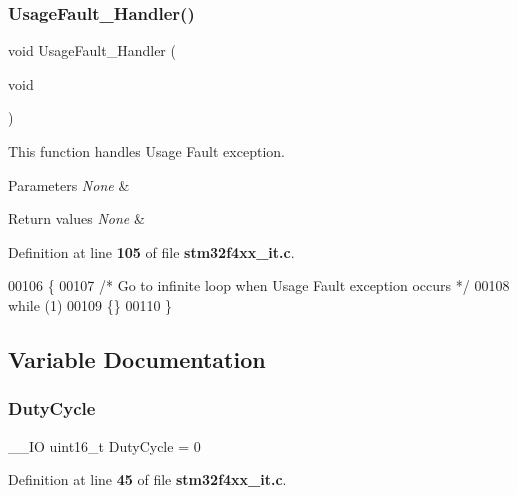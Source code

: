 \subsubsection{Usage\+Fault\+\_\+\+Handler()}
{\footnotesize\ttfamily void Usage\+Fault\+\_\+\+Handler (\begin{DoxyParamCaption}\item[{void}]{ }\end{DoxyParamCaption})}



This function handles Usage Fault exception. 


\begin{DoxyParams}{Parameters}
{\em None} & \\
\hline
\end{DoxyParams}

\begin{DoxyRetVals}{Return values}
{\em None} & \\
\hline
\end{DoxyRetVals}


Definition at line \textbf{ 105} of file \textbf{ stm32f4xx\+\_\+it.\+c}.


\begin{DoxyCode}
00106 \{
00107   \textcolor{comment}{/* Go to infinite loop when Usage Fault exception occurs */}
00108   \textcolor{keywordflow}{while} (1)
00109   \{\}
00110 \}
\end{DoxyCode}


\subsection{Variable Documentation}
\mbox{\label{group__TIM__PWM__Input_gab9dc41d132c0c4158a03bf7c66051f46}} 
\subsubsection{Duty\+Cycle}
{\footnotesize\ttfamily \+\_\+\+\_\+\+IO uint16\+\_\+t Duty\+Cycle = 0}



Definition at line \textbf{ 45} of file \textbf{ stm32f4xx\+\_\+it.\+c}.

\mbox{\label{group__TIM__PWM__Input_gacde10dfe8fee7fed60803ec1a7d6dd39}} 
